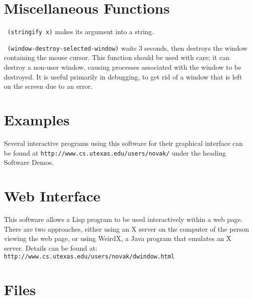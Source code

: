\section{Miscellaneous Functions}

{\tt \hspace*{0.5in} (stringify x)} makes its argument into a string.

{\tt \hspace*{0.5in} (window-destroy-selected-window)} waits 3 seconds,
then destroys the window containing the mouse cursor.  This function
should be used with care; it can destroy a non-user window, causing
processes associated with the window to be destroyed.  It is useful
primarily in debugging, to get rid of a window that is left on the screen
due to an error.
                

\section{Examples}

Several interactive programs using this software for their graphical
interface can be found at {\tt http://www.cs.utexas.edu/users/novak/}
under the heading Software Demos.


\section{Web Interface}

This software allows a Lisp program to be used interactively within
a web page.  There are two approaches, either using an X server on
the computer of the person viewing the web page, or using WeirdX, a
Java program that emulates an X server.  Details can be found at:
{\tt http://www.cs.utexas.edu/users/novak/dwindow.html} 


\section{Files}

